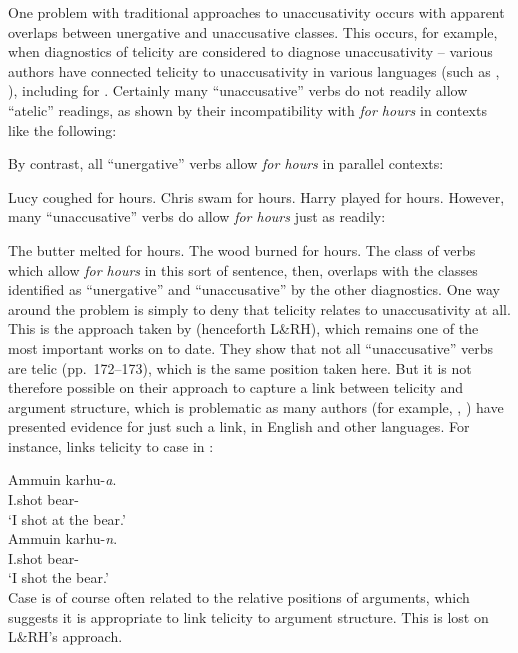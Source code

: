 \documentclass[output=paper]{langsci/langscibook}
\begin{document}
One problem with traditional approaches to unaccusativity occurs with apparent
overlaps between unergative and unaccusative classes. This occurs, for example,
when diagnostics of telicity are considered to diagnose unaccusativity –
various authors have connected telicity to unaccusativity in various languages
(such as \citealt{Zaenen1988}, \citealt{Borer2005}), including
\citet[227]{Schoorlemmer2004} for . Certainly many
\enquote{unaccusative} verbs do not readily allow \enquote{atelic} readings, as
shown by their incompatibility with \emph{for hours} in contexts like the
following:

\ea
    \z
\z
By contrast, all \enquote{unergative} verbs allow \emph{for hours} in
parallel contexts:

\ea
    \ea Lucy coughed for hours.
    \ex Chris swam for hours.
    \ex Harry played for hours.
    \z
\z
However, many \enquote{unaccusative} verbs do allow \emph{for hours} just as
readily:

\ea
    \ea The butter melted for hours.
    \ex The wood burned for hours.
    \z
\z
The class of verbs which allow \emph{for hours} in this sort of sentence,
then, overlaps with the classes identified as \enquote{unergative} and
\enquote{unaccusative} by the other diagnostics. One way around the problem is
simply to deny that telicity relates to unaccusativity at all. This is the
approach taken by \citet{LevinRappaportHovav1995} (henceforth L\&RH), which
remains one of the most important works on  to date.  They
show that not all \enquote{unaccusative} verbs are telic (pp.\ 172--173), which is
the same position taken here. But it is not therefore possible on their
approach to capture a link between telicity and argument structure, which is
problematic as many authors (for example, \citealt{Tenny1987},
\citealt{Borer2005}) have presented evidence for just such a link, in English
and other languages. For instance, \citet{Kiparsky1998} links telicity to case
in :

\ea {}
    \ea
        \gll    Ammuin   karhu-\textit{a}.\\
               I.shot   bear-\Part\\
        \glt   \enquote*{I shot at the bear.}\\
    \ex
        \gll    Ammuin   karhu-\textit{n}.\\
                I.shot   bear-\Acc\\
        \glt   \enquote*{I shot the bear.}\\
    \z
\z
Case is of course often related to the relative positions of arguments, which
suggests it is appropriate to link telicity to argument structure. This is lost
on L\&RH’s approach.
\end{document}
